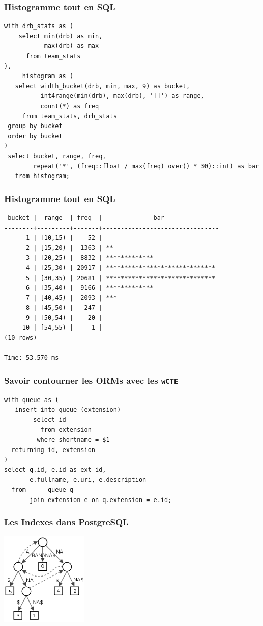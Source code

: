 \documentclass{beamer}
\begin{document}
\begin{frame}[fragile]
  \frametitle{Histogramme tout en SQL}
  
  \begin{verbatim}
with drb_stats as (
    select min(drb) as min,
           max(drb) as max
      from team_stats
),
     histogram as (
   select width_bucket(drb, min, max, 9) as bucket,
          int4range(min(drb), max(drb), '[]') as range,
          count(*) as freq
     from team_stats, drb_stats
 group by bucket
 order by bucket
)
 select bucket, range, freq,
        repeat('*', (freq::float / max(freq) over() * 30)::int) as bar
   from histogram;
  \end{verbatim}
\end{frame}

\begin{frame}[fragile]
  \frametitle{Histogramme tout en SQL}
  
  \begin{verbatim}
 bucket |  range  | freq  |              bar               
--------+---------+-------+--------------------------------
      1 | [10,15) |    52 | 
      2 | [15,20) |  1363 | **
      3 | [20,25) |  8832 | *************
      4 | [25,30) | 20917 | ******************************
      5 | [30,35) | 20681 | ******************************
      6 | [35,40) |  9166 | *************
      7 | [40,45) |  2093 | ***
      8 | [45,50) |   247 | 
      9 | [50,54) |    20 | 
     10 | [54,55) |     1 | 
(10 rows)

Time: 53.570 ms
\end{verbatim}
\end{frame}

\begin{frame}[fragile]
  \frametitle{Savoir contourner les ORMs avec les \texttt{wCTE}}
  
  \begin{verbatim}
with queue as (
   insert into queue (extension)
        select id
          from extension
         where shortname = $1
  returning id, extension
)
select q.id, e.id as ext_id,
       e.fullname, e.uri, e.description
  from      queue q
       join extension e on q.extension = e.id;    
  \end{verbatim}
\end{frame}

\begin{frame}
  \frametitle{Les Indexes dans PostgreSQL}

  \begin{center}
    \includegraphics[height=12em]{suffix-tree-banana.png}
  \end{center}
\end{frame}
\end{document}

